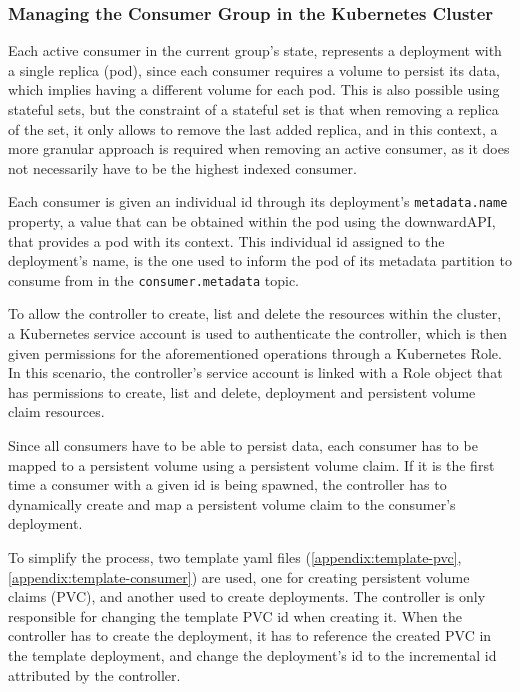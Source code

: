 \subsubsection{Managing the Consumer Group in the Kubernetes Cluster}

Each active consumer in the current group's state, represents a deployment with
a single replica (pod), since each consumer requires a volume to persist its
data, which implies having a different volume for each pod. This is also
possible using stateful sets, but the constraint of a stateful set is that when
removing a replica of the set, it only allows to remove the last added replica,
and in this context, a more granular approach is required when removing an
active consumer, as it does not necessarily have to be the highest indexed
consumer.

Each consumer is given an individual id through its deployment's
\lstinline{metadata.name} property, a value that can be obtained within the pod
using the downwardAPI, that provides a pod with its context. This individual id
assigned to the deployment's name, is the one used to inform the pod of its
metadata partition to consume from in the \lstinline{consumer.metadata} topic.

To allow the controller to create, list and delete the resources within the
cluster, a Kubernetes service account is used to authenticate the controller,
which is then given permissions for the aforementioned operations through a
Kubernetes Role. In this scenario, the controller's service account is linked
with a Role object that has permissions to create, list and delete, deployment
and persistent volume claim resources.

Since all consumers have to be able to persist data, each consumer has to be
mapped to a persistent volume using a persistent volume claim. If it is the
first time a consumer with a given id is being spawned, the controller has to
dynamically create and map a persistent volume claim to the consumer's
deployment.

To simplify the process, two template yaml files (\ref{appendix:template-pvc},
\ref{appendix:template-consumer}) are used, one for creating persistent volume
claims (PVC), and another used to create deployments. The controller is only
responsible for changing the template PVC id when creating it. When the
controller has to create the deployment, it has to reference the created PVC in
the template deployment, and change the deployment's id to the incremental id
attributed by the controller.

